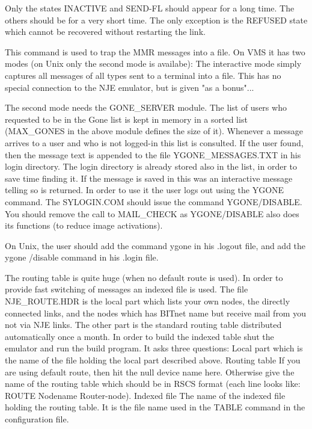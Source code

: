Only the states INACTIVE and SEND-FL should appear for a long time.  The
others  should  be  for  a  very  short  time. The only exception is the
REFUSED state which cannot be recovered without restarting the link.

\vfill\eject


This command is used to trap the MMR messages into a file. On VMS  it
has two modes (on Unix only the second mode is availabe):
The interactive mode simply captures all messages of all types sent to a
terminal into a  file.  This  has  no  special  connection  to  the  NJE
emulator, but is given "as a bonus"...

The  second  mode  needs  the  GONE\_SERVER module. The list of users who
requested to be in the Gone list is kept in  memory  in  a  sorted  list
(MAX\_GONES  in  the  above  module  defines  the size of it). Whenever a
message arrives to a  user  and  who  is  not  logged-in  this  list  is
consulted.  If  the user found, then the message text is appended to the
file YGONE\_MESSAGES.TXT in his login directory. The login  directory  is
already  stored  also  in the list, in order to save time finding it. If
the message is saved in this was an interactive message  telling  so  is
returned. In order to use it the user logs out using the YGONE command.
The  SYLOGIN.COM  should  issue the command YGONE/DISABLE. You should
remove the call to MAIL\_CHECK as YGONE/DISABLE also does  its  functions
(to reduce image activations).

On  Unix,  the user should add the command ygone in his .logout file,
and add the ygone /disable command in his .login file.

\vfill\eject


The routing table is quite huge (when no default route is  used).  In
order to provide fast switching of messages an indexed file is used. The
file NJE\_ROUTE.HDR is the local part which lists  your  own  nodes,  the
directly  connected  links,  and  the  nodes  which  has BITnet name but
receive mail from you not via NJE links. The other part is the  standard
routing  table distributed automatically once a month. In order to build
the indexed table shut the emulator and run the build program.  It  asks
three questions:
\hfill\break
{\ncrBold Local  part}
which  is  the  name  of  the  file  holding the local part
described above.
\hfill\break
{\ncrBold Routing table}
 If you are using default route, then hit the  null  device
name  here. Otherwise give the name of the routing table which should be
in RSCS format (each line looks like: ROUTE  Nodename  Router-node).
\hfill\break
{\ncrBold Indexed} file The name of the indexed file holding the routing table.
It is the file name used in the TABLE command in the configuration file.

